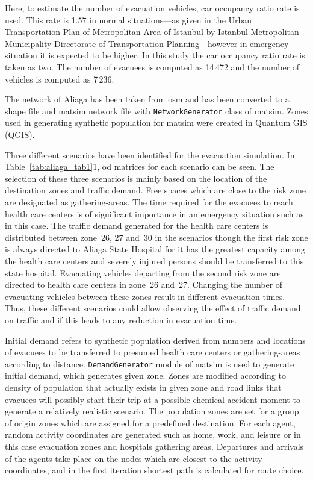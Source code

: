 Here, to estimate the number of evacuation vehicles, car occupancy ratio rate is used. This rate is 1.57 in normal situations---as given in the Urban Transportation Plan of Metropolitan Area of Istanbul by
Istanbul Metropolitan Municipality Directorate of Transportation Planning---however in emergency situation it is expected to be higher. In this study the car occupancy ratio rate is taken as two. The number of evacuees is computed as 14\,472 and the number of vehicles is computed as 7\,236.

The network of Aliaga has been taken from \gls{osm} and has been converted to a shape file and \gls{matsim} network file with \lstinline|NetworkGenerator| class of \gls{matsim}. Zones used in generating synthetic population for \gls{matsim} were created in Quantum GIS (QGIS).

Three different scenarios have been identified for the evacuation simulation. In Table~\ref{tab:aliaga_tab1}1, \gls{od} matrices for each scenario can be seen. The selection of these three scenarios is mainly based on the location of the destination zones and traffic demand. Free spaces which are close to the risk zone are designated as gathering-areas. The time required for the evacuees to reach health care centers is of significant importance in an emergency situation such as in this case. The traffic demand generated for the health care centers is distributed between zone~26, 27 and~30 in the scenarios though the first risk zone is always directed to Aliaga State Hospital for it has the greatest capacity among the health care centers and severely injured persons should be transferred to this state hospital. Evacuating vehicles departing from the second risk zone are directed to health care centers in zone~26 and~27. Changing the number of evacuating vehicles between these zones result in different evacuation times. Thus, these different scenarios could allow observing the effect of traffic demand on traffic and if this leads to any reduction in evacuation time.

Initial demand refers to synthetic population derived from numbers and locations of evacuees to be transferred to presumed health care centers or gathering-areas according to distance. \lstinline|DemandGenerator| module of \gls{matsim}  is used to generate initial demand, which generates given zone. Zones are modified according to density of population that actually exists in given zone and road links that evacuees will possibly start their trip at a possible chemical accident moment to generate a relatively realistic scenario. The population zones are set for a group of origin zones which are assigned for a predefined destination. For each agent, random activity coordinates are generated such as home, work, and leisure or in this case evacuation zones and hospitals gathering areas. Departures and arrivals of the agents take place on the nodes which are closest to the activity coordinates, and in the first iteration shortest path is calculated for route choice.

